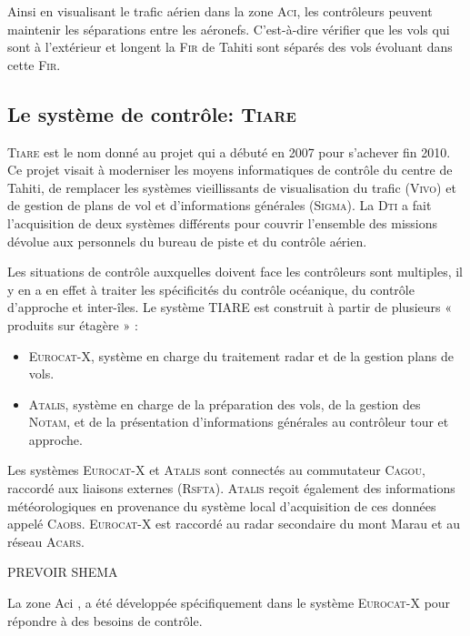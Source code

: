Ainsi en visualisant le trafic aérien dans la zone \textsc{Aci}, les contrôleurs peuvent maintenir les séparations entre les aéronefs. C'est-à-dire vérifier que les vols qui sont à l’extérieur et longent la \textsc{Fir} de Tahiti sont séparés des vols évoluant dans cette \textsc{Fir}.

    \subsection{Le système de contrôle: \textsc{Tiare}}
\textsc{Tiare} est le nom donné au projet qui a débuté en 2007 pour s'achever fin 2010. Ce projet visait à moderniser les moyens informatiques de contrôle du centre de Tahiti, de remplacer les systèmes vieillissants de visualisation du trafic (\textsc{Vivo}) et de gestion de plans de vol et d'informations générales (\textsc{Sigma}). La \textsc{Dti} a fait l'acquisition de deux systèmes différents pour couvrir l’ensemble des missions dévolue aux personnels du bureau de piste et du contrôle aérien.

Les situations de contrôle auxquelles doivent face les contrôleurs sont multiples, il y en a en effet à traiter les spécificités du contrôle océanique, du contrôle d’approche et inter-îles. Le système TIARE est construit à partir de plusieurs « produits sur étagère » :
\begin{itemize}
  \item \textsc{Eurocat-X}, système en charge du traitement radar et de la gestion plans de vols.
  \item \textsc{Atalis}, système en charge de la préparation des vols, de la gestion des \textsc{Notam}, et de la présentation d’informations générales au contrôleur tour et approche.
\end{itemize}\medskip

Les systèmes \textsc{Eurocat-X} et \textsc{Atalis} sont connectés au commutateur \textsc{Cagou}, raccordé aux liaisons externes (\textsc{Rsfta}). \textsc{Atalis} reçoit également des informations météorologiques en provenance du système local d’acquisition de ces données appelé \textsc{Caobs}. \textsc{Eurocat-X} est raccordé au radar secondaire du mont Marau et au réseau \textsc{Acars}.

PREVOIR SHEMA

La zone Aci , a été développée spécifiquement dans le système \textsc{Eurocat-X} pour répondre à des besoins de contrôle.







